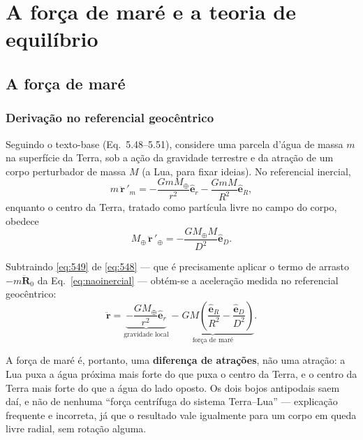 \documentclass[11pt,a4paper,oneside]{report}
\theoremstyle{definition}
\theoremstyle{plain}
\theoremstyle{remark}
\newcommand{\vect}[1]{\bm{#1}}
\newcommand{\uvec}[1]{\hat{\bm{#1}}}
\begin{document}
\part{A força de maré e a teoria de equilíbrio}
\label{parte:mare}

\chapter{A força de maré}
\label{cap:forcamare}

\section{Derivação no referencial geocêntrico}

Seguindo o texto-base (Eq.~5.48--5.51), considere uma parcela d'água de massa
$m$ na superfície da Terra, sob a ação da gravidade terrestre e da atração de
um corpo perturbador de massa $M$ (a Lua, para fixar ideias). No referencial
inercial,
\begin{equation}
m\,\ddot{\vect{r}}\,' _m=-\frac{GmM_\oplus}{r^{2}}\uvec{e}_r
-\frac{GmM}{R^{2}}\uvec{e}_R ,
\tag{T\&M~5.48}
\label{eq:548}
\end{equation}
enquanto o centro da Terra, tratado como partícula livre no campo do corpo,
obedece
\begin{equation}
M_\oplus\,\ddot{\vect{r}}\,'_\oplus=-\frac{GM_\oplus M}{D^{2}}\uvec{e}_D .
\tag{T\&M~5.49}
\label{eq:549}
\end{equation}

Subtraindo \eqref{eq:549} de \eqref{eq:548} — que é precisamente aplicar o
termo de arrasto $-m\ddot{\vect{R}}_0$ da Eq.~\eqref{eq:naoinercial} —
obtém-se a aceleração medida no referencial geocêntrico:
\begin{equation}
\ddot{\vect{r}}=
\underbrace{-\frac{GM_\oplus}{r^{2}}\uvec{e}_r}_{\text{gravidade local}}
\;\underbrace{-\;GM\left(\frac{\uvec{e}_R}{R^{2}}
-\frac{\uvec{e}_D}{D^{2}}\right)}_{\text{força de maré}} .
\tag{T\&M~5.50--5.51}
\label{eq:551}
\end{equation}

A força de maré é, portanto, uma \textbf{diferença de atrações}, não uma
atração: a Lua puxa a água próxima mais forte do que puxa o centro da Terra, e
o centro da Terra mais forte do que a água do lado oposto. Os dois bojos
antipodais saem daí, e não de nenhuma ``força centrífuga do sistema
Terra--Lua'' — explicação frequente e incorreta, já que o resultado vale
igualmente para um corpo em queda livre radial, sem rotação alguma.
\end{document}
